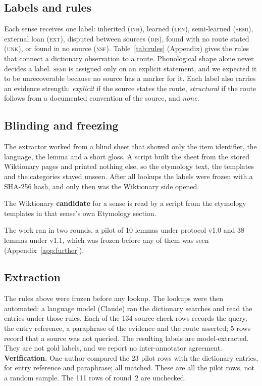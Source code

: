 \documentclass[11pt]{article}
\newcommand{\lbl}[1]{\textsc{#1}}
\begin{document}
\subsection{Labels and rules}

Each sense receives one label: inherited (\lbl{inh}), learned (\lbl{lrn}), semi-learned (\lbl{semi}), external loan (\lbl{ext}), disputed between sources (\lbl{dis}), found with no route stated (\lbl{unk}), or found in no source (\lbl{nsf}). Table~\ref{tab:rules} (Appendix) gives the rules that connect a dictionary observation to a route. Phonological shape alone never decides a label. \lbl{semi} is assigned only on an explicit statement, and we expected it to be unrecoverable because no source has a marker for it. Each label also carries an evidence strength: \textit{explicit} if the source states the route, \textit{structural} if the route follows from a documented convention of the source, and \textit{none}.


\subsection{Blinding and freezing}

The extractor worked from a blind sheet that showed only the item identifier, the language, the lemma and a short gloss. A script built the sheet from the stored Wiktionary pages and printed nothing else, so the etymology text, the templates and the categories stayed unseen. After all lookups the labels were frozen with a SHA-256 hash, and only then was the Wiktionary side opened.

The Wiktionary \textbf{candidate} for a sense is read by a script from the etymology templates in that sense's own Etymology section.

The work ran in two rounds, a pilot of 10 lemmas under protocol v1.0 and 38 lemmas under v1.1, which was frozen before any of them was seen (Appendix~\ref{app:further}).

\subsection{Extraction}
\label{sec:extraction}

The rules above were frozen before any lookup. The lookups were then automated: a language model (Claude) ran the dictionary searches and read the entries under those rules. Each of the 134 source-check rows records the query, the entry reference, a paraphrase of the evidence and the route asserted; 5 rows record that a source was not queried. The resulting labels are model-extracted. They are not gold labels, and we report no inter-annotator agreement. \textbf{Verification.} One author compared the 23 pilot rows with the dictionary entries, for entry reference and paraphrase; all matched. These are all the pilot rows, not a random sample. The 111 rows of round~2 are unchecked.
\end{document}
